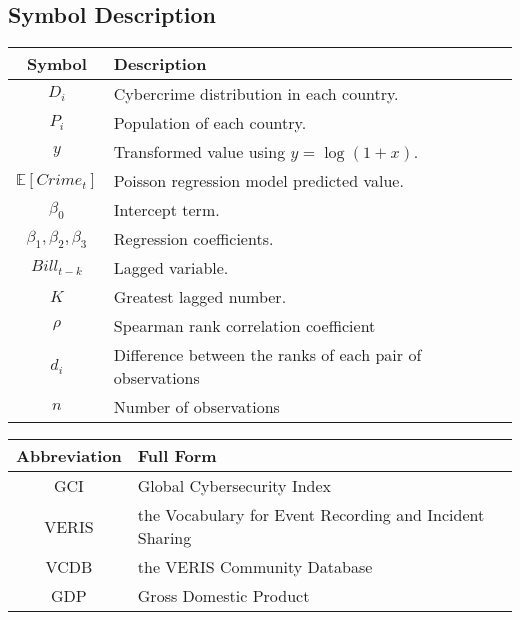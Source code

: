 \subsection{Symbol Description}\label{subsec:symbol-description} %
\begin{tabular}{cl}
    \hline
    \textbf{Symbol} & \textbf{Description} \\
    \hline
    $D_i$                     & Cybercrime distribution in each country. \\
    $P_i$                     & Population of each country. \\
    $y$                       & Transformed value using \( y = \log(1 + x) \). \\
    $\mathbb{E}[Crime_t]$     & Poisson regression model predicted value. \\
    $\beta_0$                 & Intercept term. \\
    $\beta_1,\beta_2,\beta_3$ & Regression coefficients. \\
    $Bill_{t-k}$              & Lagged variable. \\
    $K$                       & Greatest lagged number. \\
    $\rho$                    & Spearman rank correlation coefficient \\
    $d_i$                     & Difference between the ranks of each pair of observations \\
    $n$                       & Number of observations \\
    \hline
\end{tabular}

\bigskip

\noindent
\begin{tabular}{cl}
    \hline
    \textbf{Abbreviation} & \textbf{Full Form} \\
    \hline
    GCI   & Global Cybersecurity Index\cite{gci-2024} \\
    VERIS & the Vocabulary for Event Recording and Incident Sharing\cite{veris} \\
    VCDB  & the VERIS Community Database\cite{vcdb} \\
    GDP   & Gross Domestic Product \\
    \hline
\end{tabular}
